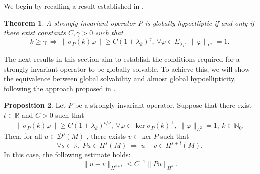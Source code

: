 \documentclass{amsart}
\newtheorem{theorem}{Theorem}[section]
\theoremstyle{definition}
\newtheorem{proposition}[theorem]{Proposition}
\theoremstyle{remark}
\numberwithin{equation}{section}
\begin{document}
	We begin by recalling a result established in \cite{KM2020}.
	
	\begin{theorem}\label{KM}
		A strongly invariant operator $P$ is globally hypoelliptic if and only if there exist constants $C,\gamma >0$ such that
		\begin{equation*}
			k\geq \gamma\ \Rightarrow\ \|\sigma_P(k)\varphi\|\geq C(1+\lambda_k)^\gamma,\ \forall \varphi\in E_{\lambda_k},\ \|\varphi\|_{L^2}=1.
		\end{equation*}
	\end{theorem}
	
	The next results in this section aim to establish the conditions required for a strongly invariant operator to be globally solvable. To achieve this, we will show the equivalence between global solvability and almost global hypoellipticity, following the approach proposed in \cite{Araujo2019}.
	
	\begin{proposition}\label{est_1}
		Let $P$ be a strongly invariant operator. Suppose that there exist $t\in\mathbb{R}$ and $C>0$ such that
		\begin{equation}\label{6.1}
			\|\sigma_P(k)\varphi\|\geq C(1+\lambda_k)^{t/\nu},\ \forall \varphi\in\ker\sigma_P(k)^\perp,\ \|\varphi\|_{L^2}=1,\ k\in\mathbb{N}_0.
		\end{equation}
		Then, for all $u\in\mathscr{D}'(M)$ , there exists $v\in\ker P$ such that
		\begin{equation}
			\forall s\in\mathbb{R},\ Pu\in H^s(M)\ \Rightarrow\ u-v\in H^{s+t}(M).
		\end{equation}
		In this case, the following estimate holds:
		\begin{equation*}
			\|u-v\|_{H^{s+t}}\leq C^{-1}\|Pu\|_{H^s}.
		\end{equation*}
	\end{proposition}
	
\end{document}
